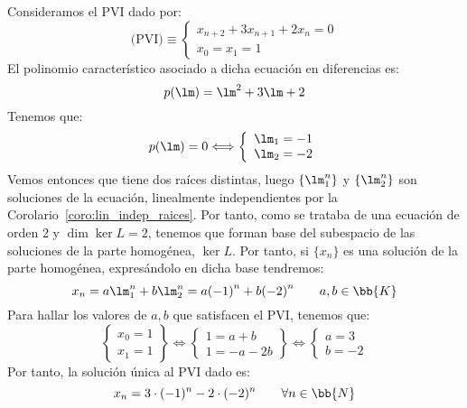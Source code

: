 \begin{ejemplo} Consideramos el PVI dado por:
    \begin{equation*}
        \text{(PVI)}\equiv \left\{
        \begin{array}{l}
            x_{n+2} + 3x_{n+1} + 2x_n = 0 \\
            x_0 = x_1 = 1
        \end{array}\right.
    \end{equation*}
    El polinomio característico asociado a dicha ecuación en diferencias es:
    \begin{equation*}
        p(\lm) = \lm^2 + 3\lm + 2 
    \end{equation*}
    Tenemos que:
    \begin{equation*}
        p(\lm)=0 \Longleftrightarrow
        \left\{\begin{array}{l}
            \lm_1=-1\\\lm_2=-2
        \end{array}\right.
    \end{equation*}
    Vemos entonces que tiene dos raíces distintas, luego $\{\lm_1^n\}$ y $\{\lm_2^n\}$ son soluciones de la ecuación, linealmente independientes por la Corolario~\ref{coro:lin_indep_raices}. Por tanto, como se trataba de una ecuación de orden 2 y $\dim \ker L=2$, tenemos que forman base del subespacio de las soluciones de la parte homogénea, $\ker L$. Por tanto, si $\{x_n\}$ es una solución de la parte homogénea, expresándolo en dicha base tendremos:
    \begin{equation*}
        x_n = a\lm_1^n + b\lm_2^n = a{(-1)}^n + b{(-2)}^n \qquad a,b\in \bb{K}
    \end{equation*}
    Para hallar los valores de $a,b$ que satisfacen el PVI, tenemos que:
    \begin{equation*}
        \left\{\begin{array}{l}
            x_0=1\\x_1=1
        \end{array}\right\}
        \Longleftrightarrow
        \left\{\begin{array}{l}
            1=a+b\\
            1 = -a-2b
        \end{array}\right\}
        \Longleftrightarrow
        \left\{\begin{array}{l}
            a=3\\
            b=-2
        \end{array}\right.
    \end{equation*}
    Por tanto, la solución única al PVI dado es:
    \begin{equation*}
        x_n = 3\cdot (-1)^n -2\cdot (-2)^n  \qquad \forall n\in \bb{N}
    \end{equation*}
\end{ejemplo}

